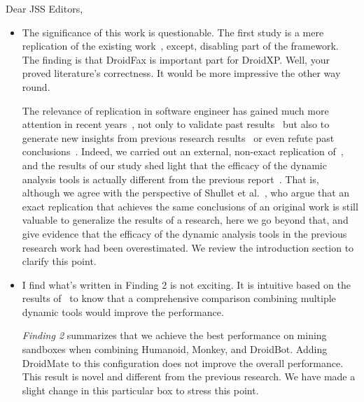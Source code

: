 \documentclass[12pt,english]{scrartcl}
\begin{document}
\begin{letter}{Dear JSS Editors,}
\begin{itemize}
\vspace{0.2cm}

\item The significance of this work is questionable. The first study is a mere replication of the existing
  work~\cite{DBLP:conf/wcre/BaoLL18}, except, disabling 
part of the framework. The finding is that DroidFax is important part for DroidXP. Well, your proved literature's correctness. 
It would be more impressive the other way round.


\vspace{0.2cm}

{\color{blue}{\bf Answer.} The relevance of replication in software engineer
  has gained much more attention in recent years~\cite{role-of-replication,shepperd-role-replication},
  not only to validate past results~\cite{msr-replication} but also to generate new insights
  from previous research results~\cite{kohl:icse-2020} or even refute past conclusions~\cite{toplas-replication}.
  Indeed, we carried out an external, non-exact replication
  of~\cite{DBLP:conf/wcre/BaoLL18}, and the results of our study
  shed light that the efficacy of the dynamic analysis tools is
  actually different from the previous report~\cite{DBLP:conf/wcre/BaoLL18}. That is,
  although we agree with the perspective of
  Shullet et al.~\cite{role-of-replication},
  who argue that an exact replication that achieves the same conclusions of an original work
  is still valuable to generalize the results of a research, here we go beyond that,
  and give evidence that the efficacy of the dynamic analysis tools in the previous research
  work had been overestimated. We review the introduction section to clarify this point.}

\vspace{0.2cm}

\item I find what's written in Finding 2 is not exciting. It is intuitive based on the results
  of~\cite{jamrozikZ16} to know that a comprehensive 
comparison combining multiple dynamic tools would improve the performance.


\vspace{0.2cm}

{\color{blue}{\bf Answer.}\emph{Finding 2} summarizes that we achieve the best performance on mining sandboxes when combining Humanoid, Monkey, and DroidBot. Adding DroidMate to this configuration does not improve the overall performance. This result is novel and different from the previous research. We have made a slight change in this particular box to stress this point.}


\end{itemize}
\end{letter}
\end{document}
